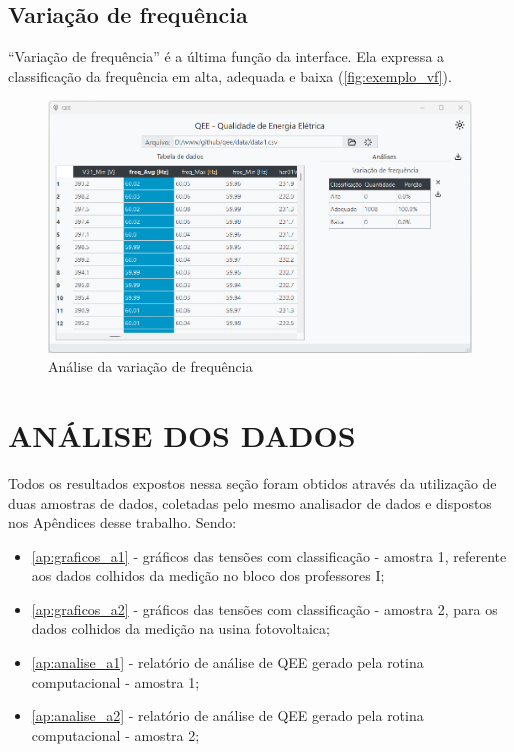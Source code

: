 \subsection{Variação de frequência}

“Variação de frequência” é a última função da interface. Ela expressa a classificação da frequência em alta, adequada e baixa (\autoref{fig:exemplo_vf}).

\begin{figure}[H]
  \centering
  \caption{Análise da variação de frequência}
  \label{fig:exemplo_vf}
  \includegraphics[width=15cm]{illustrations/figures/exemplo_vf.png}
\end{figure}

\section{ANÁLISE DOS DADOS}

Todos os resultados expostos nessa seção foram obtidos através da utilização de duas amostras de dados, coletadas pelo mesmo analisador de dados e dispostos nos Apêndices desse trabalho. Sendo:

\begin{itemize}
  \item \autoref{ap:graficos_a1} - gráficos das tensões com classificação - amostra 1, referente aos dados colhidos da medição no bloco dos professores I;
  \item \autoref{ap:graficos_a2} - gráficos das tensões com classificação - amostra 2, para os dados colhidos da medição na usina fotovoltaica;
  \item \autoref{ap:analise_a1} - relatório de análise de QEE gerado pela rotina computacional - amostra 1;
  \item \autoref{ap:analise_a2} - relatório de análise de QEE gerado pela rotina computacional -
  amostra 2;
\end{itemize}


